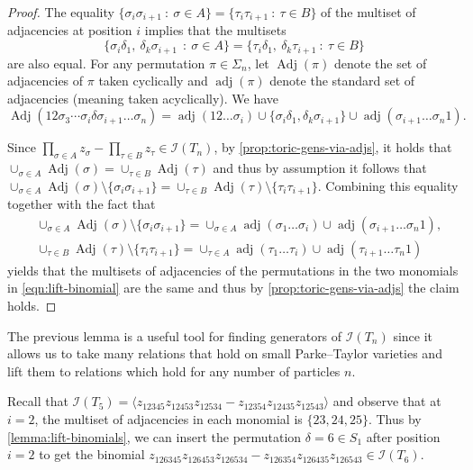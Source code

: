 \documentclass[12pt, reqno]{amsart}
\numberwithin{equation}{section}
\theoremstyle{plain}
\theoremstyle{definition}
\newenvironment{example}
  {\pushQED{\qed}\renewcommand{\qedsymbol}{$\triangle$}\examplex}
  {\popQED\endexamplex}
\newcommand{\ci}{\mathcal{I}}
\DeclareMathOperator{\adj}{adj}
\DeclareMathOperator{\Adj}{Adj}
\begin{document}
\begin{proof}
The equality $\{ \sigma_i \sigma_{i+1} ~:~ \sigma \in A \} = \{\tau_i \tau_{i+1}~:~ \tau \in B \}$ of the multiset of adjacencies at position $i$ implies 
that the multisets
\[
\{ \sigma_i \delta_1,~ \delta_k \sigma_{i+1} ~~:~ \sigma \in A \} = \{ \tau_i \delta_1,~ \delta_k \tau_{i+1} ~:~ \tau \in B\}
\]
are also equal. For any permutation $\pi \in \Sigma_n$, let $\Adj(\pi)$ denote the set of adjacencies of $\pi$ taken cyclically and $\adj(\pi)$ denote the standard set of adjacencies (meaning taken acyclically). We have
\begin{equation}
\label{eqn:lift-perm-adj-decomp}
\Adj(12 \sigma_3 \cdots \sigma_i \delta \sigma_{i+1} \ldots \sigma_n) = \adj(12\ldots \sigma_i) \cup\{\sigma_i \delta_1, \delta_k \sigma_{i+1
} \} \cup \adj(\sigma_{i+1} \ldots \sigma_n 1).   
\end{equation}


Since $\prod_{\sigma\in A} z_\sigma - \prod_{\tau\in B} z_\tau \in \ci(T_n)$, by \cref{prop:toric-gens-via-adjs}, it holds that $\cup_{\sigma \in A} \Adj(\sigma) = \cup_{\tau \in B} \Adj(\tau)$ and thus by assumption it follows that $\cup_{\sigma \in A} \Adj(\sigma) \setminus \{\sigma_i \sigma_{i+1}\} = \cup_{\tau \in B} \Adj(\tau) \setminus \{\tau_i \tau_{i+1}\}$. Combining this equality together with the fact that
\begin{align}
\label{eqn:perm-union-decomp}
&\cup_{\sigma \in A} \Adj(\sigma) \setminus \{\sigma_i \sigma_{i+1} \} = \cup_{\sigma \in A} \adj(\sigma_1 \ldots \sigma_i) \cup \adj(\sigma_{i+1} \ldots \sigma_n 1), \\
&\cup_{\tau \in B} \Adj(\tau) \setminus \{\tau_i \tau_{i+1}\} = \cup_{\tau\in A} \adj(\tau_1 \ldots \tau_i) \cup \adj(\tau_{i+1} \ldots \tau_n 1)
\end{align}
yields that the multisets of adjacencies of the permutations in the two monomials in \cref{eqn:lift-binomial} are the same and thus by \cref{prop:toric-gens-via-adjs} the claim holds. 
\end{proof}


The previous lemma is a useful tool for finding generators of $\ci(T_n)$ since it allows us to take many relations that hold on small Parke--Taylor varieties and lift them to relations which hold for any number of particles $n$.


\begin{example}
Recall that $\ci(T_5) = \langle z_{12345}z_{12453}z_{12534} - z_{12354}z_{12435}z_{12543} \rangle$ and observe that at $i = 2$, the multiset of adjacencies in each monomial is $\{23, 24, 25\}$. Thus by \cref{lemma:lift-binomials}, we can insert the permutation $\delta = 6 \in S_1$ after position $i = 2$ to get the binomial $z_{126345}z_{126453}z_{126534}-z_{126354}z_{126435}z_{126543} \in \ci(T_6)$. 
\end{example}
\end{document}
